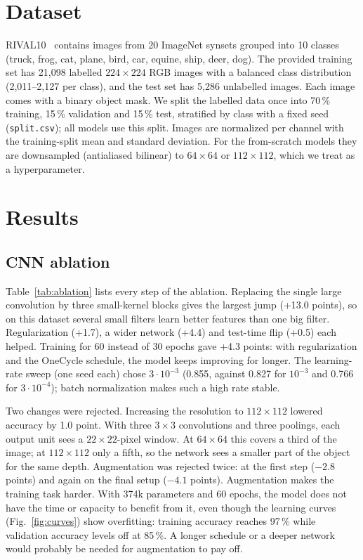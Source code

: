 \documentclass[conference]{IEEEtran}
\begin{document}
\section{Dataset}
RIVAL10~\cite{rival10} contains images from 20 ImageNet synsets grouped into 10 classes (truck, frog, cat, plane, bird, car, equine, ship, deer, dog). The provided training set has 21{,}098 labelled $224\times224$ RGB images with a balanced class distribution (2{,}011--2{,}127 per class), and the test set has 5{,}286 unlabelled images. Each image comes with a binary object mask. We split the labelled data once into 70\,\% training, 15\,\% validation and 15\,\% test, stratified by class with a fixed seed (\texttt{split.csv}); all models use this split. Images are normalized per channel with the training-split mean and standard deviation. For the from-scratch models they are downsampled (antialiased bilinear) to $64\times64$ or $112\times112$, which we treat as a hyperparameter.

\section{Results}
\subsection{CNN ablation}
Table~\ref{tab:ablation} lists every step of the ablation. Replacing the single large convolution by three small-kernel blocks gives the largest jump (+13.0 points), so on this dataset several small filters learn better features than one big filter. Regularization (+1.7), a wider network (+4.4) and test-time flip (+0.5) each helped. Training for 60 instead of 30 epochs gave +4.3 points: with regularization and the OneCycle schedule, the model keeps improving for longer. The learning-rate sweep (one seed each) chose $3\cdot10^{-3}$ (0.855, against 0.827 for $10^{-3}$ and 0.766 for $3\cdot10^{-4}$); batch normalization makes such a high rate stable.

Two changes were rejected. Increasing the resolution to $112\times112$ lowered accuracy by 1.0 point. With three $3\times3$ convolutions and three poolings, each output unit sees a $22\times22$-pixel window. At $64\times64$ this covers a third of the image; at $112\times112$ only a fifth, so the network sees a smaller part of the object for the same depth. Augmentation was rejected twice: at the first step ($-2.8$ points) and again on the final setup ($-4.1$ points). Augmentation makes the training task harder. With 374k parameters and 60 epochs, the model does not have the time or capacity to benefit from it, even though the learning curves (Fig.~\ref{fig:curves}) show overfitting: training accuracy reaches 97\,\% while validation accuracy levels off at 85\,\%. A longer schedule or a deeper network would probably be needed for augmentation to pay off.
\end{document}
